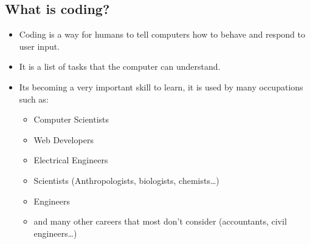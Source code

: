 \documentclass[12pt]{article}
\begin{document}
\subsection*{What is coding?}
	\begin{itemize}
		\item Coding is a way for humans to tell computers how to behave and respond to user input.
		\item It is a list of tasks that the computer can understand.
		\item Its becoming a very important skill to learn, it is used by many occupations such as:
		\begin{itemize}
			\item Computer Scientists
			\item Web Developers
			\item Electrical Engineers
			\item Scientists (Anthropologists, biologists, chemists…)
			\item Engineers
			\item and many other careers that most don't consider (accountants, civil engineers…)
		\end{itemize}
	\end{itemize}
\end{document}
